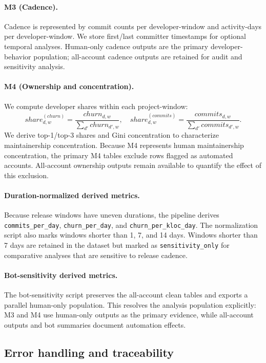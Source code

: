 \paragraph{M3 (Cadence).}
Cadence is represented by commit counts per developer-window and activity-days per developer-window.
We store first/last committer timestamps for optional temporal analyses. Human-only cadence outputs are the primary
developer-behavior population; all-account cadence outputs are retained for audit and sensitivity analysis.

\paragraph{M4 (Ownership and concentration).}
We compute developer shares within each project-window:
\[
share^{(churn)}_{d,w}=\frac{churn_{d,w}}{\sum_{d'}churn_{d',w}}, \quad
share^{(commits)}_{d,w}=\frac{commits_{d,w}}{\sum_{d'}commits_{d',w}}.
\]
We derive top-1/top-3 shares and Gini concentration to characterize maintainership concentration.
Because M4 represents human maintainership concentration, the primary M4 tables exclude rows flagged as automated accounts.
All-account ownership outputs remain available to quantify the effect of this exclusion.

\paragraph{Duration-normalized derived metrics.}
Because release windows have uneven durations, the pipeline derives \texttt{commits\_per\_day},
\texttt{churn\_per\_day}, and \texttt{churn\_per\_kloc\_day}. The normalization script also marks windows shorter
than 1, 7, and 14 days. Windows shorter than 7 days are retained in the dataset but marked as
\texttt{sensitivity\_only} for comparative analyses that are sensitive to release cadence.

\paragraph{Bot-sensitivity derived metrics.}
The bot-sensitivity script preserves the all-account clean tables and exports a parallel human-only population.
This resolves the analysis population explicitly: M3 and M4 use human-only outputs as the primary evidence,
while all-account outputs and bot summaries document automation effects.

\subsection{Error handling and traceability}
\label{sec:phase1_error_trace}

